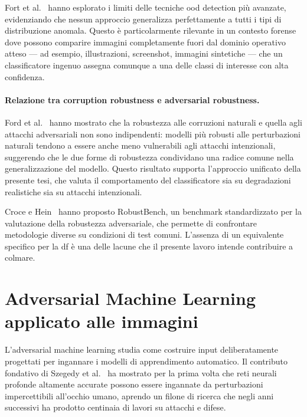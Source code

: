 Fort et al.~\cite{fort2021exploring} hanno esplorato i limiti delle tecniche \gls{ood} detection più avanzate, evidenziando che nessun approccio generalizza perfettamente a tutti i tipi di distribuzione anomala. Questo è particolarmente rilevante in un contesto forense dove possono comparire immagini completamente fuori dal dominio operativo atteso — ad esempio, illustrazioni, screenshot, immagini sintetiche — che un classificatore ingenuo assegna comunque a una delle classi di interesse con alta confidenza.

\paragraph{Relazione tra corruption robustness e adversarial robustness.}
Ford et al.~\cite{ford2019adversarial} hanno mostrato che la robustezza alle corruzioni naturali e quella agli attacchi adversariali non sono indipendenti: modelli più robusti alle perturbazioni naturali tendono a essere anche meno vulnerabili agli attacchi intenzionali, suggerendo che le due forme di robustezza condividano una radice comune nella generalizzazione del modello. Questo risultato supporta l'approccio unificato della presente tesi, che valuta il comportamento del classificatore sia su degradazioni realistiche sia su attacchi intenzionali.

Croce e Hein~\cite{croce2020robustbench} hanno proposto RobustBench, un benchmark standardizzato per la valutazione della robustezza adversariale, che permette di confrontare metodologie diverse su condizioni di test comuni. L'assenza di un equivalente specifico per la \gls{df} è una delle lacune che il presente lavoro intende contribuire a colmare.


\section{Adversarial Machine Learning applicato alle immagini}
\label{sec:adversarial}

L'adversarial machine learning studia come costruire input deliberatamente progettati per ingannare i modelli di apprendimento automatico. Il contributo fondativo di Szegedy et al.~\cite{szegedy2013intriguing} ha mostrato per la prima volta che reti neurali profonde altamente accurate possono essere ingannate da perturbazioni impercettibili all'occhio umano, aprendo un filone di ricerca che negli anni successivi ha prodotto centinaia di lavori su attacchi e difese.

